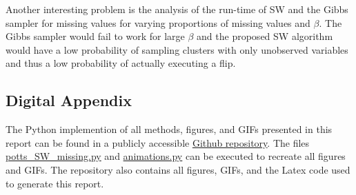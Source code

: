 \documentclass[12pt, twoside]{article}
\newcommand{\1}{\mathbb{1}}
\begin{document}
Another interesting problem is the analysis of the run-time of SW and the Gibbs sampler for missing values for varying proportions of missing values and $\beta$. The Gibbs sampler would fail to work for large $\beta$ and the proposed SW algorithm would have a low probability of sampling clusters with only unobserved variables and thus a low probability of actually executing a flip.

\clearpage
 
{}


\clearpage
\begin{appendix}
\appendix
\section*{Digital Appendix}
The Python implemention of all methods, figures, and GIFs presented in this report can be found in a publicly accessible  \href{https://github.com/maierhofert/2DPottsModel.git}{\underline{Github repository}}. The files \url{potts_SW_missing.py} and \url{animations.py} can be executed to recreate all figures and GIFs.
The repository also contains all figures, GIFs, and the Latex code used to generate this report.
\end{appendix}
\end{document}
